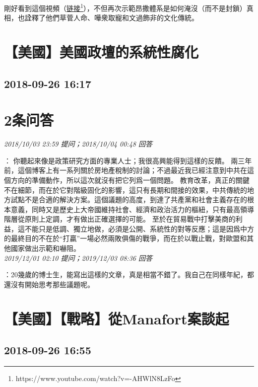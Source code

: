 \documentclass[twocolumn]{ctexart}
\begin{document}
剛好看到這個視頻（\href{https://www.youtube.com/watch?v=-AHWlN8LzFo}{链接\footnote{\url{https://www.youtube.com/watch?v=-AHWlN8LzFo}}}），不但再次示範昂撒體系是如何淹沒（而不是封鎖）真相，也詮釋了他們草菅人命、嘩衆取寵和文過飾非的文化傳統。
\\


\section{【美國】美國政壇的系統性腐化}
\subsection{2018-09-26 16:17}


\section{2条问答}

\textit{\hfill\noindent\small 2018/10/03 23:59 提问；2018/10/04 00:48 回答}

：
你聽起來像是政策研究方面的專業人士；我很高興能得到這樣的反饋。
兩三年前，這個博客上有一系列關於房地產稅制的討論；不過最近我已經注意到中共在這個方向的準備動作，所以這次就沒有把它列爲一個問題。
教育改革，真正的關鍵不在細節，而在於它對階級固化的影響，這只有長期和間接的效果，中共傳統的地方試點不是合適的解決方案。這個議題的高度，到達了共產黨和社會主義存在的根本意義，同時又是歷史上大帝國維持社會、經濟和政治活力的樞紐，只有最高領導階層從原則上定調，才有做出正確選擇的可能。
至於在貿易戰中打擊美商的利益，這不能只是低調、獨立地做，必須是公開、系統性的對等反應；這是因爲中方的最終目的不在於“打贏”一場必然兩敗俱傷的戰爭，而在於以戰止戰，對歐盟和其他國家做出示範和嚇阻。
\\

\textit{\hfill\noindent\small 2019/12/01 02:10 提问；2019/12/03 08:36 回答}

：20幾歲的博士生，能寫出這樣的文章，真是相當不錯了。我自己在同樣年紀，都還沒有開始思考那些議題呢。
\\


\section{【美國】【戰略】從Manafort案談起}
\subsection{2018-09-26 16:55}
\end{document}
